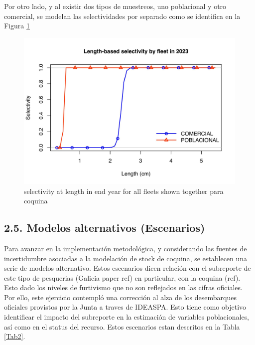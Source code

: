\documentclass[
]{article}
\begin{document}
Por otro lado, y al existir dos tipos de muestreos, uno poblacional y otro comercial, se modelan las selectividades por separado como se identifica en la Figura \ref{fig:sel}

\begin{figure}[H]

{\centering \includegraphics[width=0.8\linewidth]{Dtrunculus_SS3_2024_files/figure-latex/sel-1} 

}

\caption{\label{fig:sel}selectivity at length in end year for all fleets shown together para coquina}\label{fig:sel}
\end{figure}

\hypertarget{modelos-alternativos-escenarios}{%
\subsection{2.5. Modelos alternativos (Escenarios)}\label{modelos-alternativos-escenarios}}

Para avanzar en la implementación metodológica, y considerando las fuentes de incertidumbre asociadas a la modelación de stock de coquina, se establecen una serie de modelos alternativo. Estos escenarios dicen relación con el subreporte de este tipo de pesquerias (Galicia paper ref) en particular, con la coquina (ref). Esto dado los niveles de furtivismo que no son reflejados en las cifras oficiales. Por ello, este ejercicio contempló una corrección al alza de los desembarques oficiales provistos por la Junta a traves de IDEASPA. Esto tiene como objetivo identificar el impacto del subreporte en la estimación de variables poblacionales, así como en el status del recurso. Estos escenarios estan descritos en la Tabla \ref{Tab2}.
\end{document}
